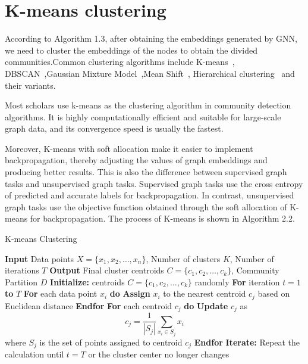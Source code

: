 \documentclass[ %
                    author={Tengyao Tu},
                supervisor={Dr. James Pope},
                    degree={MSc},
                     title={A New Perspective on Graph Community Detection: Combining Traditional Methods with Deep Learning Approaches},
                  subtitle={Applying to Telecom Networks and Diverse Datasets},
                      type={},
                      year={2024}]{dissertation}
\begin{document}
\section{K-means clustering}
According to Algorithm 1.3, after obtaining the embeddings generated by GNN, we need to cluster the embeddings of the nodes to obtain the divided communities.Common clustering algorithms include K-means~\cite{burkardt2009k}, DBSCAN~\cite{deng2020dbscan},Gaussian Mixture Model~\cite{reynolds2009gaussian},Mean Shift~\cite{comaniciu2002mean}, Hierarchical clustering~\cite{nielsen2016hierarchical} and their variants.

Most scholars use k-means as the clustering algorithm in community detection algorithms. It is highly computationally efficient and suitable for large-scale graph data, and its convergence speed is usually the fastest. 

Moreover, K-means with soft allocation make it easier to implement backpropagation, thereby adjusting the values of graph embeddings and producing better results. This is also the difference between supervised graph tasks and unsupervised graph tasks. Supervised graph tasks use the cross entropy of predicted and accurate labels for backpropagation. In contrast, unsupervised graph tasks use the objective function obtained through the soft allocation of K-means for backpropagation. The process of K-means is shown in Algorithm 2.2.
\begin{algorithm}[ht!]
\caption{K-means Clustering}
\begin{framedalgorithm}[ht!]
    
    \State \textbf{Input} Data points $X = \{x_1, x_2, \ldots, x_n\}$, Number of clusters $K$, Number of iterations $T$\newline 
    \State \textbf{Output} Final cluster centroids $C = \{c_1, c_2, \ldots, c_k\}$, Community Partition $D$\newline
    \State \textbf{Initialize:} centroids $C = \{c_1, c_2, \ldots, c_k\}$ randomly\newline
    \State \textbf{For} iteration $t = 1$ \textbf{to} $T$\newline
    \State \phantom{hold}\textbf{For} each data point $x_i$ \textbf{do}\newline
    \State \phantom{hold}\textbf{Assign} $x_i$ to the nearest centroid $c_j$ based on Euclidean distance\newline 
    \State \phantom{hold}\textbf{Endfor}\newline
     \State\phantom{hold}\textbf{For} each centroid $c_j$ \textbf{do} \newline
        \phantom{hold}\State \textbf{Update} $c_j$ as 
        \[
        c_j = \frac{1}{|S_j|} \sum_{x_i \in S_j} x_i
        \]
        \phantom{hold}where $S_j$ is the set of points assigned to centroid $c_j$ \newline
    \State \phantom{hold}\textbf{Endfor}\newline
      \State \textbf{Iterate:} Repeat the calculation until $t=T$ or the cluster center no longer changes\newline
\end{framedalgorithm}
\end{algorithm}
\end{document}
